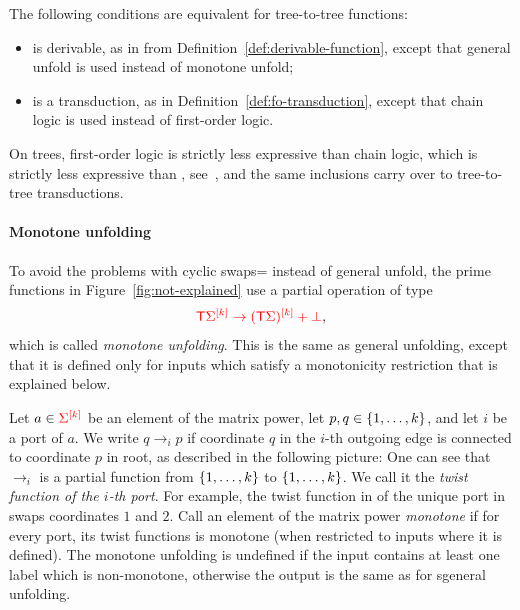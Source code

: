 \begin{theorem}\label{thm:chain-transductions}
    The following conditions are equivalent for tree-to-tree functions:
\begin{itemize}
    \item is derivable, as in  from Definition~\ref{def:derivable-function}, except that general unfold is used instead of monotone unfold;
    \item is a transduction,  as in  Definition~\ref{def:fo-transduction},  except that chain logic is used instead of first-order logic. 
\end{itemize}
\end{theorem}

On trees, first-order logic is strictly less expressive than chain logic, which is strictly less expressive than \mso, see~\cite[Fact 2.5.8]{bojanczykDecidablePropertiesTree2004}, and the same inclusions carry over to tree-to-tree transductions.
\paragraph*{Monotone unfolding}
To avoid the problems with cyclic swaps= instead of general unfold, the prime functions in Figure~\ref{fig:not-explained} use a partial operation of type
\begin{align*}
    \ranked{\tmonad \mati k{\Sigma} \to \mati k{( \tmonad \Sigma)} + \termset} ,
\end{align*}
which is called \emph{monotone unfolding}. This is the same as general unfolding, except that it is defined only for inputs which satisfy a monotonicity restriction that is explained below.

 Let  $a \in \mati k \rSigma$ be an element of the matrix power,  let $p,q \in \set{1,\ldots,k}$, and let  $i$ be a port of $a$. We write $
     q \to_i p$
if coordinate $q$ in the $i$-th outgoing edge  is connected to  coordinate $p$ in root, as described in the following picture:
One can see that $\to_i$ is a partial function from $\set{1,\ldots,k}$ to $\set{1,\ldots,k}$. We call it the  \emph{twist function of the $i$-th port}. For example, the twist function in of the unique port in 
swaps coordinates $1$ and $2$.  Call  an element of the matrix power  \emph{monotone} if for every port, its twist functions is monotone (when restricted to inputs where it is defined). The monotone unfolding  is undefined if the input contains at least one label which is non-monotone, otherwise the output is the same as for sgeneral unfolding.

